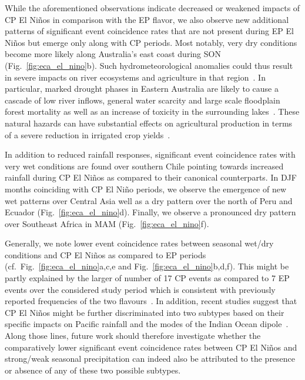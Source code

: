 \documentclass[utf8]{frontiersSCNS} %
\begin{document}
While the aforementioned observations indicate decreased or weakened impacts of CP El Ni\~nos in comparison with the EP flavor, we also observe new additional patterns of significant event coincidence rates that are not present during EP El Ni\~nos but emerge only along with CP periods. Most notably, very dry conditions become more likely along Australia's east coast during SON (Fig.~\ref{fig:eca_el_nino}b). Such hydrometeorological anomalies could thus result in severe impacts on river ecosystems and agriculture in that region~\citep{leblanc2012review}. In particular, marked drought phases in Eastern Australia are likely to cause a cascade of low river inflows, general water scarcity and large scale floodplain forest mortality as well as an increase of toxicity in the surrounding lakes~\citep{leblanc2012review}. These natural hazards can have substantial effects on agricultural production in terms of a severe reduction in irrigated crop yields~\citep{vandijk2013}. 

In addition to reduced rainfall responses, significant event coincidence rates with very wet conditions are found over southern Chile pointing towards increased rainfall during CP El Ni\~nos as compared to their canonical counterparts. In DJF months coinciding with CP El Ni\~no periods, we observe the emergence of new wet patterns over Central Asia well as a dry pattern over the north of Peru and Ecuador (Fig.~\ref{fig:eca_el_nino}d). Finally, we observe a pronounced dry pattern over Southeast Africa in MAM (Fig.~\ref{fig:eca_el_nino}f). 

Generally, we note lower event coincidence rates between seasonal wet/dry conditions and CP El Ni\~nos as compared to EP periods (cf.\ Fig.~\ref{fig:eca_el_nino}a,c,e and Fig.~\ref{fig:eca_el_nino}b,d,f). 
This might be partly explained by the larger of number of 17 CP events as compared to 7 EP events over the considered study period which is consistent with previously reported frequencies of the two flavours~\citep{hendon_prospects_2009,graf_central_2012, preethi2015impacts, wiedermann_climate_2016}. In addition, recent studies suggest that CP El Ni\~nos might be further discriminated into two subtypes based on their specific impacts on Pacific rainfall and the modes of the Indian Ocean dipole~\citep{wang2013classifying, wang2014different, wang2018new}. Along those lines, future work should therefore investigate whether the comparatively lower significant event coincidence rates between CP El Ni\~nos and strong/weak seasonal precipitation can indeed also be attributed to the presence or absence of any of these two possible subtypes.\\
\end{document}
